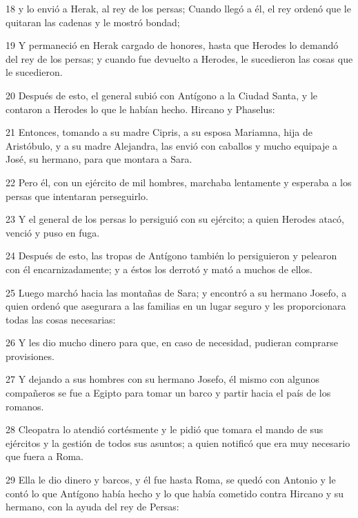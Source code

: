 \par 18 y lo envió a Herak, al rey de los persas; Cuando llegó a él, el rey ordenó que le quitaran las cadenas y le mostró bondad;

\par 19 Y permaneció en Herak cargado de honores, hasta que Herodes lo demandó del rey de los persas; y cuando fue devuelto a Herodes, le sucedieron las cosas que le sucedieron.

\par 20 Después de esto, el general subió con Antígono a la Ciudad Santa, y le contaron a Herodes lo que le habían hecho. Hircano y Phaselus:

\par 21 Entonces, tomando a su madre Cipris, a su esposa Mariamna, hija de Aristóbulo, y a su madre Alejandra, las envió con caballos y mucho equipaje a José, su hermano, para que montara a Sara.

\par 22 Pero él, con un ejército de mil hombres, marchaba lentamente y esperaba a los persas que intentaran perseguirlo.

\par 23 Y el general de los persas lo persiguió con su ejército; a quien Herodes atacó, venció y puso en fuga.

\par 24 Después de esto, las tropas de Antígono también lo persiguieron y pelearon con él encarnizadamente; y a éstos los derrotó y mató a muchos de ellos.

\par 25 Luego marchó hacia las montañas de Sara; y encontró a su hermano Josefo, a quien ordenó que asegurara a las familias en un lugar seguro y les proporcionara todas las cosas necesarias:

\par 26 Y les dio mucho dinero para que, en caso de necesidad, pudieran comprarse provisiones.

\par 27 Y dejando a sus hombres con su hermano Josefo, él mismo con algunos compañeros se fue a Egipto para tomar un barco y partir hacia el país de los romanos.

\par 28 Cleopatra lo atendió cortésmente y le pidió que tomara el mando de sus ejércitos y la gestión de todos sus asuntos; a quien notificó que era muy necesario que fuera a Roma.

\par 29 Ella le dio dinero y barcos, y él fue hasta Roma, se quedó con Antonio y le contó lo que Antígono había hecho y lo que había cometido contra Hircano y su hermano, con la ayuda del rey de Persas:

